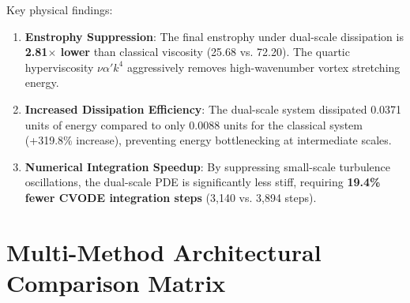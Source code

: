 \documentclass[10pt,twocolumn]{article}
\begin{document}
\begin{table}[h]
\centering
\small
\caption{\textbf{Use Case 3: Dual-Scale vs. Classical Viscosity}}
\label{tab:use_case_3}
\end{table}

\noindent Key physical findings:
\begin{enumerate}[leftmargin=*]
  \setlength\itemsep{1pt}
  \item \textbf{Enstrophy Suppression}: The final enstrophy under dual-scale dissipation is \textbf{2.81$\times$ lower} than classical viscosity (25.68 vs. 72.20). The quartic hyperviscosity $\nu \alpha' k^4$ aggressively removes high-wavenumber vortex stretching energy.
  \item \textbf{Increased Dissipation Efficiency}: The dual-scale system dissipated 0.0371 units of energy compared to only 0.0088 units for the classical system (+319.8\% increase), preventing energy bottlenecking at intermediate scales.
  \item \textbf{Numerical Integration Speedup}: By suppressing small-scale turbulence oscillations, the dual-scale PDE is significantly less stiff, requiring \textbf{19.4\% fewer CVODE integration steps} (3,140 vs. 3,894 steps).
\end{enumerate}

\section{Multi-Method Architectural Comparison Matrix}
\end{document}
